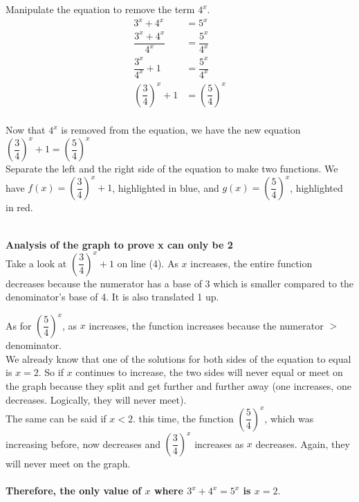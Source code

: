 \documentclass[12pt]{book}
\begin{document}
\begin{enumerate}
Manipulate the equation to remove the term $4^x$.
\setcounter{equation}{0}
\begin{align}
    3^x + 4^x &= 5^x\\
    \dfrac{3^x+4^x}{4^x} &= \dfrac{5^x}{4^x}\\
    \dfrac{3^x}{4^x} + 1 &= \dfrac{5^x}{4^x}\\
    \left(\dfrac{3}{4} \right)^x + 1 &= \left(\dfrac{5}{4} \right)^x
\end{align}\\
Now that $4^x$ is removed from the equation, we have the new equation $\left(\dfrac{3}{4} \right)^x + 1 = \left(\dfrac{5}{4} \right)^x$\\

Separate the left and the right side of the equation to make two functions. We have $f(x) = \left(\dfrac{3}{4} \right)^x + 1$, highlighted in blue, and $g(x) = \left(\dfrac{5}{4} \right)^x$, highlighted in red.\\\\

\newpage

\textbf{Analysis of the graph to prove x can only be 2}\\

Take a look at $\left(\dfrac{3}{4} \right)^x + 1$ on line (4). As $x$ increases, the entire function decreases because the numerator has a base of 3 which is smaller compared to the denominator's base of 4. It is also translated 1 up.

As for $\left(\dfrac{5}{4} \right)^x$, as $x$ increases, the function increases because the numerator $>$ denominator.\\

We already know that one of the solutions for both sides of the equation to equal is $x = 2$. So if $x$ continues to increase, the two sides will never equal or meet on the graph because they split and get further and further away (one increases, one decreases. Logically, they will never meet).\\

The same can be said if $x < 2$. this time, the function $\left(\dfrac{5}{4}\right)^x$, which was increasing before, now decreases and $\left(\dfrac{3}{4}\right)^x$ increases as $x$ decreases. Again, they will never meet on the graph.\\\\

\textbf{Therefore, the only value of $x$ where $3^x + 4^x = 5^x$ is $x = 2$}.\\




\end{enumerate}
\end{document}
